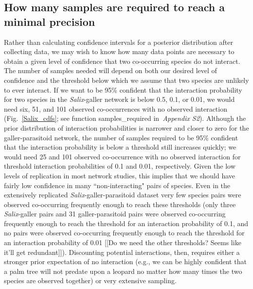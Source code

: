 \documentclass[12pt]{article}
\begin{document}
  \subsection*{How many samples are required to reach a minimal precision}

      Rather than calculating confidence intervals for a posterior distribution after collecting data, we may wish to know how many data points are necessary to obtain a given level of confidence that two co-occurring species do not interact. The number of samples needed will depend on both our desired level of confidence and the threshold below which we assume that two species are unlikely to ever interact. If we want to be 95\% confident that the interaction probability for two species in the \emph{Salix}-galler network is below 0.5, 0.1, or 0.01, we would need six, 51, and 101 observed co-occurrences with no observed interaction (Fig.~\ref{Salix_cdfs}; see function samples\_required in~\emph{Appendix S2}). Although the prior distribution of interaction probabilities is narrower and closer to zero for the galler-parasitoid network, the number of samples required to be 95\% confident that the interaction probability is below a threshold still increases quickly; we would need 25 and 101 observed co-occurrence with no observed interaction for threshold interaction probabilities of 0.1 and 0.01, respectively. Given the low levels of replication in most network studies, this implies that we should have fairly low confidence in many ``non-interacting" pairs of species. Even in the extensively replicated \emph{Salix}-galler-parasitoid dataset very few species pairs were observed co-occurring frequently enough to reach these thresholds (only three \emph{Salix}-galler pairs and 31 galler-parasitoid pairs were observed co-occurring frequently enough to reach the threshold for an interaction probability of 0.1, and no pairs were observed co-occurring frequently enough to reach the threshold for an interaction probability of 0.01 [[Do we need the other thresholds? Seems like it'll get redundant]]). Discounting potential interactions, then, requires either a stronger prior expectation of no interaction (e.g., we can be highly confident that a palm tree will not predate upon a leopard no matter how many times the two species are observed together) or very extensive sampling.
\end{document}
